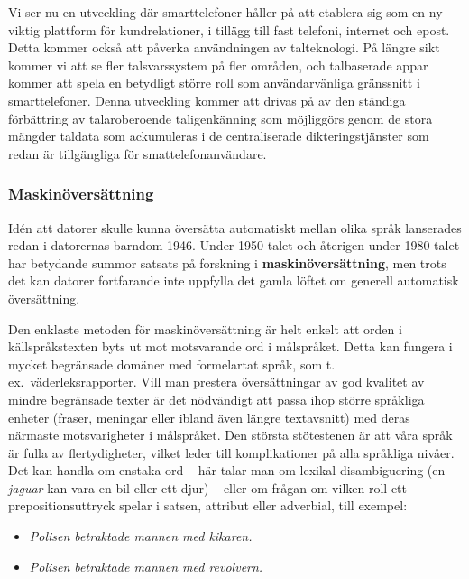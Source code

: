 \begin{multicols}{2}
Vi ser nu en utveckling där smarttelefoner håller på att etablera sig
som en ny viktig plattform för kundrelationer, i tillägg till fast
telefoni, internet och epost. Detta kommer också att påverka
användningen av talteknologi. På längre sikt kommer vi att se fler
talsvarssystem på fler områden, och talbaserade appar kommer att spela
en betydligt större roll som användarvänliga gränssnitt i
smarttelefoner. Denna utveckling kommer att drivas på av den ständiga
förbättring av talaroberoende taligenkänning som möjliggörs genom de
stora mängder taldata som ackumuleras i de centraliserade
dikteringstjänster som redan är tillgängliga för smattelefonanvändare.


\subsubsection{Maskin\-över\-sätt\-ning}

Idén att datorer skulle kunna översätta automatiskt mellan olika språk
lanserades redan i datorernas barndom 1946. Under 1950-talet och
återigen under 1980-talet har betydande summor satsats på forskning i
\textbf{maskinöversättning}, men trots det kan datorer fortfarande
inte uppfylla det gamla löftet om generell automatisk översättning.


Den enklaste metoden för maskinöversättning är helt enkelt att orden i
källspråkstexten byts ut mot motsvarande ord i målspråket. Detta kan
fungera i mycket begränsade domäner med formelartat språk, som
t.\,ex.~väderleksrapporter. Vill man prestera översättningar av god
kvalitet av mindre begränsade texter är det nödvändigt att passa ihop
större språkliga enheter (fraser, meningar eller ibland även längre
textavsnitt) med deras närmaste motsvarigheter i målspråket. Den
största stötestenen är att våra språk är fulla av flertydigheter,
vilket leder till komplikationer på alla språkliga nivåer. Det kan
handla om enstaka ord -- här talar man om lexikal disambiguering (en
\textit{jaguar} kan vara en bil eller ett djur) -- eller om
frågan om vilken roll ett prepositionsuttryck spelar i satsen,
attribut eller adverbial, till exempel:

\begin{itemize}
\item \textit{Polisen betraktade mannen med kikaren.}
\item \textit{Polisen betraktade mannen med revolvern.}
\end{itemize}


\end{multicols}

